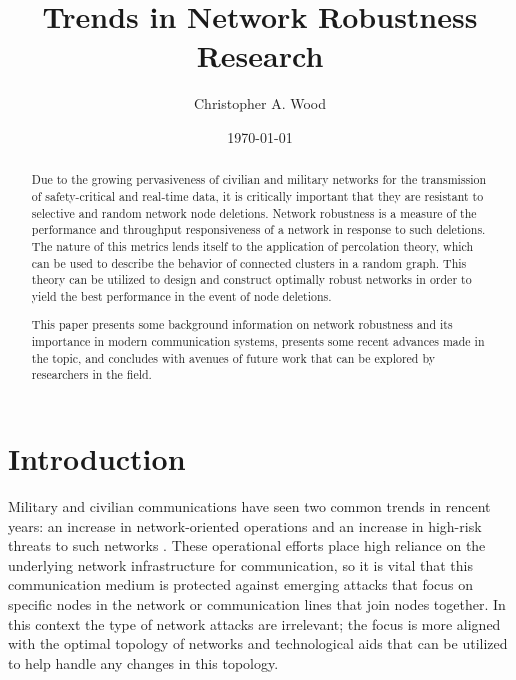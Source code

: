 \documentclass[10pt,a4paper,onecolumn]{article}
\author{Christopher A. Wood}
\title{Trends in Network Robustness Research}
\date{\today}
\begin{document}
\maketitle

\begin{abstract}
Due to the growing pervasiveness of civilian and 
military networks for the transmission of safety-critical and real-time data, 
it is critically important that they are resistant to selective and random network 
node deletions. Network robustness is a measure of the performance and 
throughput responsiveness of a network in response to such deletions. The nature of 
this metrics lends itself to the application of percolation theory, which can be
used to describe the behavior of connected clusters in a random graph. This theory
can be utilized to design and construct optimally robust networks in order to yield
the best performance in the event of node deletions.

This paper presents some background information on network robustness and
its importance in modern communication systems, presents some recent advances
made in the topic, and concludes with avenues of future work that can be explored
by researchers in the field. 
\end{abstract}



\section{Introduction}

Military and civilian communications have seen two common trends in rencent years: an 
increase in network-oriented operations and an increase in high-risk threats to
such networks \cite{Bernard_networkrobustness}. These operational efforts place
high reliance on the underlying network infrastructure for communication, so it is vital
that this communication medium is protected against emerging attacks that focus on
specific nodes in the network or communication lines that join nodes together. In this context
the type of network attacks are irrelevant; the focus is more aligned with the optimal topology
of networks and technological aids that can be utilized to help handle any changes in this topology. 
\end{document}
